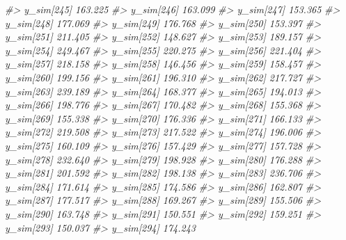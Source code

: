 \documentclass[
  10pt,
  italian,
  a4paper,
  extrafontsizes,onecolumn,openright
  ]{memoir}
\newenvironment{Shaded}{\begin{snugshade}}{\end{snugshade}}
\newcommand{\CommentTok}[1]{\textcolor[rgb]{0.56,0.35,0.01}{\textit{#1}}}
\begin{document}
\begin{Shaded}
\begin{Highlighting}[]
\CommentTok{\#\textgreater{}   y\_sim[245] 163.225}
\CommentTok{\#\textgreater{}   y\_sim[246] 163.099}
\CommentTok{\#\textgreater{}   y\_sim[247] 153.365}
\CommentTok{\#\textgreater{}   y\_sim[248] 177.069}
\CommentTok{\#\textgreater{}   y\_sim[249] 176.768}
\CommentTok{\#\textgreater{}   y\_sim[250] 153.397}
\CommentTok{\#\textgreater{}   y\_sim[251] 211.405}
\CommentTok{\#\textgreater{}   y\_sim[252] 148.627}
\CommentTok{\#\textgreater{}   y\_sim[253] 189.157}
\CommentTok{\#\textgreater{}   y\_sim[254] 249.467}
\CommentTok{\#\textgreater{}   y\_sim[255] 220.275}
\CommentTok{\#\textgreater{}   y\_sim[256] 221.404}
\CommentTok{\#\textgreater{}   y\_sim[257] 218.158}
\CommentTok{\#\textgreater{}   y\_sim[258] 146.456}
\CommentTok{\#\textgreater{}   y\_sim[259] 158.457}
\CommentTok{\#\textgreater{}   y\_sim[260] 199.156}
\CommentTok{\#\textgreater{}   y\_sim[261] 196.310}
\CommentTok{\#\textgreater{}   y\_sim[262] 217.727}
\CommentTok{\#\textgreater{}   y\_sim[263] 239.189}
\CommentTok{\#\textgreater{}   y\_sim[264] 168.377}
\CommentTok{\#\textgreater{}   y\_sim[265] 194.013}
\CommentTok{\#\textgreater{}   y\_sim[266] 198.776}
\CommentTok{\#\textgreater{}   y\_sim[267] 170.482}
\CommentTok{\#\textgreater{}   y\_sim[268] 155.368}
\CommentTok{\#\textgreater{}   y\_sim[269] 155.338}
\CommentTok{\#\textgreater{}   y\_sim[270] 176.336}
\CommentTok{\#\textgreater{}   y\_sim[271] 166.133}
\CommentTok{\#\textgreater{}   y\_sim[272] 219.508}
\CommentTok{\#\textgreater{}   y\_sim[273] 217.522}
\CommentTok{\#\textgreater{}   y\_sim[274] 196.006}
\CommentTok{\#\textgreater{}   y\_sim[275] 160.109}
\CommentTok{\#\textgreater{}   y\_sim[276] 157.429}
\CommentTok{\#\textgreater{}   y\_sim[277] 157.728}
\CommentTok{\#\textgreater{}   y\_sim[278] 232.640}
\CommentTok{\#\textgreater{}   y\_sim[279] 198.928}
\CommentTok{\#\textgreater{}   y\_sim[280] 176.288}
\CommentTok{\#\textgreater{}   y\_sim[281] 201.592}
\CommentTok{\#\textgreater{}   y\_sim[282] 198.138}
\CommentTok{\#\textgreater{}   y\_sim[283] 236.706}
\CommentTok{\#\textgreater{}   y\_sim[284] 171.614}
\CommentTok{\#\textgreater{}   y\_sim[285] 174.586}
\CommentTok{\#\textgreater{}   y\_sim[286] 162.807}
\CommentTok{\#\textgreater{}   y\_sim[287] 177.517}
\CommentTok{\#\textgreater{}   y\_sim[288] 169.267}
\CommentTok{\#\textgreater{}   y\_sim[289] 155.506}
\CommentTok{\#\textgreater{}   y\_sim[290] 163.748}
\CommentTok{\#\textgreater{}   y\_sim[291] 150.551}
\CommentTok{\#\textgreater{}   y\_sim[292] 159.251}
\CommentTok{\#\textgreater{}   y\_sim[293] 150.037}
\CommentTok{\#\textgreater{}   y\_sim[294] 174.243}

\end{Highlighting}
\end{Shaded}
\end{document}
